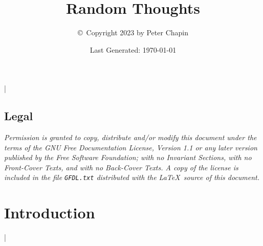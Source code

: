 \documentclass{scrreprt}
\begin{document}
\title{Random Thoughts}
\author{\copyright\ Copyright 2023 by Peter Chapin}
\date{Last Generated: \today}
\maketitle

\tableofcontents

\lstMakeShortInline|

\section*{Legal}
\label{sec:legal}

\textit{Permission is granted to copy, distribute and/or modify this document under the terms of
  the GNU Free Documentation License, Version 1.1 or any later version published by the Free
  Software Foundation; with no Invariant Sections, with no Front-Cover Texts, and with no
  Back-Cover Texts. A copy of the license is included in the file \texttt{GFDL.txt} distributed
  with the \LaTeX\ source of this document.}

\chapter{Introduction}
\label{chapt:introduction}






\newpage


\lstDeleteShortInline|




\end{document}
